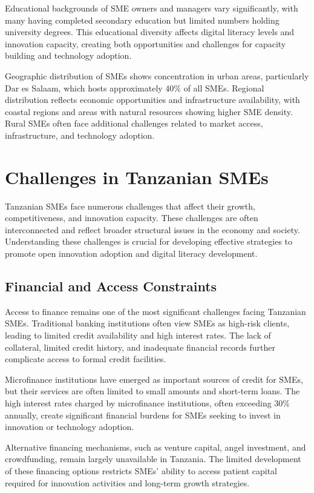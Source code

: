 \documentclass[12pt,a4paper]{article}
\begin{document}
Educational backgrounds of SME owners and managers vary significantly, with many having completed secondary education but limited numbers holding university degrees. This educational diversity affects digital literacy levels and innovation capacity, creating both opportunities and challenges for capacity building and technology adoption.

Geographic distribution of SMEs shows concentration in urban areas, particularly Dar es Salaam, which hosts approximately 40\% of all SMEs. Regional distribution reflects economic opportunities and infrastructure availability, with coastal regions and areas with natural resources showing higher SME density. Rural SMEs often face additional challenges related to market access, infrastructure, and technology adoption.

\section{Challenges in Tanzanian SMEs}

Tanzanian SMEs face numerous challenges that affect their growth, competitiveness, and innovation capacity. These challenges are often interconnected and reflect broader structural issues in the economy and society. Understanding these challenges is crucial for developing effective strategies to promote open innovation adoption and digital literacy development.

\subsection{Financial and Access Constraints}

Access to finance remains one of the most significant challenges facing Tanzanian SMEs. Traditional banking institutions often view SMEs as high-risk clients, leading to limited credit availability and high interest rates. The lack of collateral, limited credit history, and inadequate financial records further complicate access to formal credit facilities.

Microfinance institutions have emerged as important sources of credit for SMEs, but their services are often limited to small amounts and short-term loans. The high interest rates charged by microfinance institutions, often exceeding 30\% annually, create significant financial burdens for SMEs seeking to invest in innovation or technology adoption.

Alternative financing mechanisms, such as venture capital, angel investment, and crowdfunding, remain largely unavailable in Tanzania. The limited development of these financing options restricts SMEs' ability to access patient capital required for innovation activities and long-term growth strategies.
\end{document}

